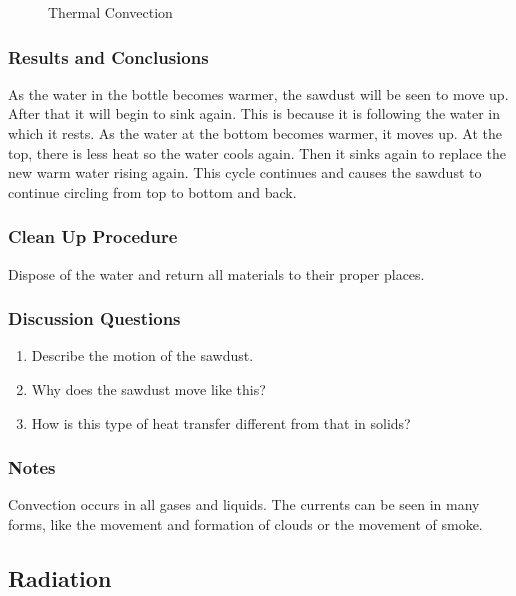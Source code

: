\begin{figure}
\begin{center}
\def\svgwidth{150pt}

\caption{Thermal Convection}
\label{fig:convection}
\end{center}
\end{figure}

\subsubsection*{Results and Conclusions}
As the water in the bottle becomes warmer, the sawdust will be seen to move up.  After that it will begin to sink again.  This is because it is following the water in which it rests.  As the water at the bottom becomes warmer, it moves up.  At the top, there is less heat so the water cools again.  Then it sinks again to replace the new warm water rising again.  This cycle continues and causes the sawdust to continue circling from top to bottom and back.

\subsubsection*{Clean Up Procedure}
Dispose of the water and return all materials to their proper places.

\subsubsection*{Discussion Questions}
\begin{enumerate}
\item{Describe the motion of the sawdust.}
\item{Why does the sawdust move like this?}
\item{How is this type of heat transfer different from that in solids?}
\end{enumerate}

\subsubsection*{Notes}
Convection occurs in all gases and liquids.  The currents can be seen in many forms, like the movement and formation of clouds or the movement of smoke.

\subsection{Radiation}

